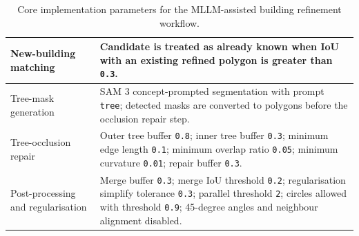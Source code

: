 \begin{table}[htb]
\begin{tabular}{|p{}|p{}|}
\hline
New-building matching & Candidate is treated as already known when IoU with an existing refined polygon is greater than \texttt{0.3}. \\
\hline
Tree-mask generation & SAM 3 concept-prompted segmentation with prompt \texttt{tree}; detected masks are converted to polygons before the occlusion repair step. \\
\hline
Tree-occlusion repair & Outer tree buffer \texttt{0.8}; inner tree buffer \texttt{0.3}; minimum edge length \texttt{0.1}; minimum overlap ratio \texttt{0.05}; minimum curvature \texttt{0.01}; repair buffer \texttt{0.3}. \\
\hline
Post-processing and regularisation & Merge buffer \texttt{0.3}; merge IoU threshold \texttt{0.2}; regularisation simplify tolerance \texttt{0.3}; parallel threshold \texttt{2}; circles allowed with threshold \texttt{0.9}; 45-degree angles and neighbour alignment disabled. \\
\hline
\end{tabular}
\caption{Core implementation parameters for the MLLM-assisted building refinement workflow.}
\label{tab:core_parameters}
\end{table}

\newpage
